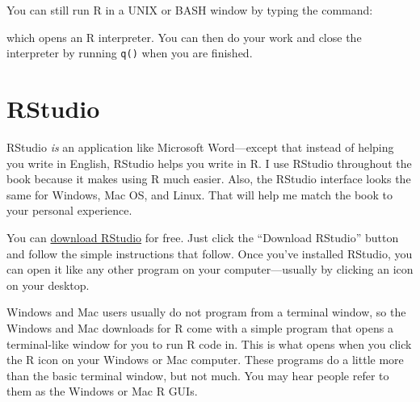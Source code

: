 \documentclass[
  letterpaper,
  DIV=11,
  numbers=noendperiod]{scrbook}
\newenvironment{Shaded}{\begin{snugshade}}{\end{snugshade}}
\newcommand{\ExtensionTok}[1]{\textcolor[rgb]{0.00,0.23,0.31}{#1}}
\newcommand{\NormalTok}[1]{\textcolor[rgb]{0.00,0.23,0.31}{#1}}
\begin{document}
\begin{tcolorbox}[enhanced jigsaw, breakable, colback=white, colbacktitle=quarto-callout-tip-color!10!white, arc=.35mm, bottomrule=.15mm, coltitle=black, left=2mm, rightrule=.15mm, colframe=quarto-callout-tip-color-frame, leftrule=.75mm, opacitybacktitle=0.6, bottomtitle=1mm, toptitle=1mm, titlerule=0mm, opacityback=0, title=\textcolor{quarto-callout-tip-color}{\faLightbulb}\hspace{0.5em}{R and UNIX}, toprule=.15mm]

You can still run R in a UNIX or BASH window by typing the command:

\begin{Shaded}
\end{Shaded}

which opens an R interpreter. You can then do your work and close the
interpreter by running \texttt{q()} when you are finished.

\end{tcolorbox}

\section{RStudio}\label{rstudio}

RStudio \emph{is} an application like Microsoft Word---except that
instead of helping you write in English, RStudio helps you write in R. I
use RStudio throughout the book because it makes using R much easier.
Also, the RStudio interface looks the same for Windows, Mac OS, and
Linux. That will help me match the book to your personal experience.

You can \href{http://www.rstudio.com/ide}{download RStudio} for free.
Just click the ``Download RStudio'' button and follow the simple
instructions that follow. Once you've installed RStudio, you can open it
like any other program on your computer---usually by clicking an icon on
your desktop.

\begin{tcolorbox}[enhanced jigsaw, breakable, colback=white, colbacktitle=quarto-callout-tip-color!10!white, arc=.35mm, bottomrule=.15mm, coltitle=black, left=2mm, rightrule=.15mm, colframe=quarto-callout-tip-color-frame, leftrule=.75mm, opacitybacktitle=0.6, bottomtitle=1mm, toptitle=1mm, titlerule=0mm, opacityback=0, title=\textcolor{quarto-callout-tip-color}{\faLightbulb}\hspace{0.5em}{The R GUIs}, toprule=.15mm]

Windows and Mac users usually do not program from a terminal window, so
the Windows and Mac downloads for R come with a simple program that
opens a terminal-like window for you to run R code in. This is what
opens when you click the R icon on your Windows or Mac computer. These
programs do a little more than the basic terminal window, but not much.
You may hear people refer to them as the Windows or Mac R GUIs.

\end{tcolorbox}
\end{document}
